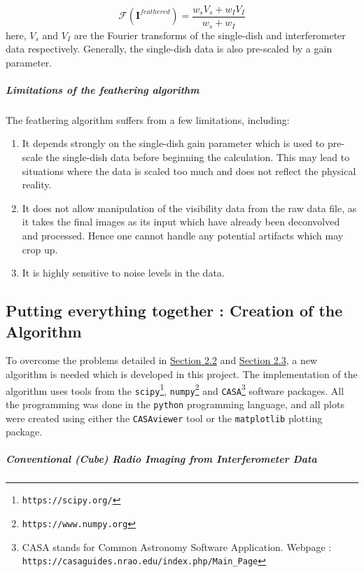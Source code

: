 \documentclass{article}
\begin{document}
\begin{equation}
\mathcal{F}(\textbf{I}^{feathered}) = \frac{w_s V_s + w_I V_I}{w_s+w_I}
\end{equation}
here, $V_s$ and $V_I$ are the Fourier transforms of the single-dish and interferometer data respectively. Generally, the single-dish data is also pre-scaled by a gain parameter.
\subparagraph{Limitations of the feathering algorithm}
The feathering algorithm suffers from a few limitations, including:
\begin{enumerate}
\item It depends strongly on the single-dish gain parameter which is used to pre-scale the single-dish data before beginning the calculation. This may lead to situations where the data is scaled too much and does not reflect the physical reality.
\item It does not allow manipulation of the visibility data from the raw data file, as it takes the final images as its input which have already been deconvolved and processed. Hence one cannot handle any potential artifacts which may crop up.
\item It is highly sensitive to noise levels in the data. 
\end{enumerate}
\label{AlgoDevpt}\subsection{Putting everything together : Creation of the Algorithm}
To overcome the problems detailed in \hyperref[section2.2]{Section 2.2} and \hyperref[section2.3]{Section 2.3}, a new algorithm is needed which is developed in this project. The implementation of the algorithm uses tools from the \texttt{scipy}\footnote{\texttt{https://scipy.org/}}, \texttt{numpy\footnote{\texttt{https://www.numpy.org}}} and \texttt{CASA}\footnote{CASA stands for Common Astronomy Software Application. Webpage : \texttt{https://casaguides.nrao.edu/index.php/Main\_Page}} software packages. All the programming was done in the \texttt{python} programming language, and all plots were created using either the \texttt{CASAviewer} tool or the \texttt{matplotlib} plotting package. 
\subparagraph{Conventional (Cube) Radio Imaging from Interferometer Data\newline}
\end{document}
